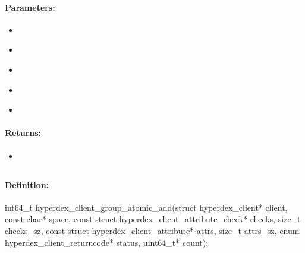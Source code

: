 \paragraph{Parameters:}
\begin{itemize}[noitemsep]
\item {}\\

\item {}\\

\item {}\\

\item {}\\

\item {}\\

\end{itemize}

\paragraph{Returns:}
\begin{itemize}[noitemsep]
\item {}\\

\end{itemize}

\pagebreak
\subsection{}
\label{api:c:group_atomic_add}


\paragraph{Definition:}
\begin{ccode}
int64_t hyperdex_client_group_atomic_add(struct hyperdex_client* client,
        const char* space,
        const struct hyperdex_client_attribute_check* checks, size_t checks_sz,
        const struct hyperdex_client_attribute* attrs, size_t attrs_sz,
        enum hyperdex_client_returncode* status,
        uint64_t* count);
\end{ccode}

